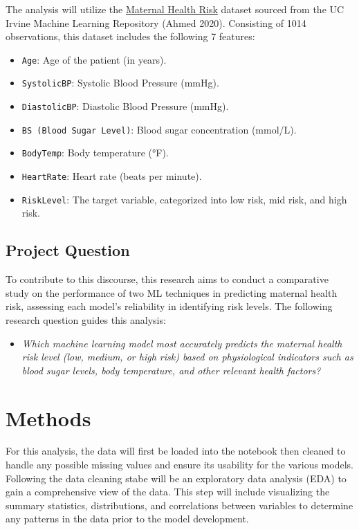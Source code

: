 \documentclass[
  letterpaper,
  DIV=11,
  numbers=noendperiod]{scrartcl}
\providecommand{\tightlist}{%
  \setlength{\itemsep}{0pt}\setlength{\parskip}{0pt}}\usepackage{longtable,booktabs,array}
\begin{document}
The analysis will utilize the
\href{https://archive.ics.uci.edu/dataset/863/maternal+health+risk}{Maternal
Health Risk} dataset sourced from the UC Irvine Machine Learning
Repository (Ahmed 2020). Consisting of 1014 observations, this dataset
includes the following 7 features:

\begin{itemize}
\tightlist
\item
  \texttt{Age}: Age of the patient (in years).
\item
  \texttt{SystolicBP}: Systolic Blood Pressure (mmHg).
\item
  \texttt{DiastolicBP}: Diastolic Blood Pressure (mmHg).
\item
  \texttt{BS\ (Blood\ Sugar\ Level)}: Blood sugar concentration
  (mmol/L).
\item
  \texttt{BodyTemp}: Body temperature (°F).
\item
  \texttt{HeartRate}: Heart rate (beats per minute).
\item
  \texttt{RiskLevel}: The target variable, categorized into low risk,
  mid risk, and high risk.
\end{itemize}

\subsection{Project Question}\label{project-question}

To contribute to this discourse, this research aims to conduct a
comparative study on the performance of two ML techniques in predicting
maternal health risk, assessing each model's reliability in identifying
risk levels. The following research question guides this analysis:

\begin{itemize}
\tightlist
\item
  \emph{Which machine learning model most accurately predicts the
  maternal health risk level (low, medium, or high risk) based on
  physiological indicators such as blood sugar levels, body temperature,
  and other relevant health factors?}
\end{itemize}

\section{Methods}\label{methods}

For this analysis, the data will first be loaded into the notebook then
cleaned to handle any possible missing values and ensure its usability
for the various models. Following the data cleaning stabe will be an
exploratory data analysis (EDA) to gain a comprehensive view of the
data. This step will include visualizing the summary statistics,
distributions, and correlations between variables to determine any
patterns in the data prior to the model development.
\end{document}
